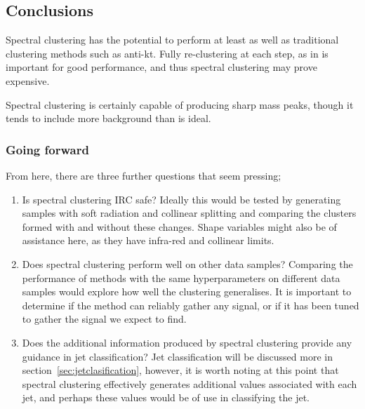 \subsection{Conclusions}
Spectral clustering has the potential to perform at least as well as 
traditional clustering methods such as anti-kt.
Fully re-clustering at each step, as in \spectralfulljet{} is important for good performance,
and thus spectral clustering may prove expensive.

Spectral clustering is certainly capable of producing sharp mass peaks,
though it tends to include more background than is ideal.

\subsubsection{Going forward}
From here, there are three further questions that seem pressing;
\begin{enumerate}
    \item Is spectral clustering IRC safe? Ideally this would be tested 
        by generating samples with soft radiation and collinear splitting
        and comparing the clusters formed with and without these changes.
        Shape variables might also be of assistance here, as they have
        infra-red and collinear limits.
    \item Does spectral clustering perform well on other data samples?
        Comparing the performance of methods with the same hyperparameters on
        different data samples would explore how well the clustering generalises.
        It is important to determine if the method can reliably gather
        any signal, or if it has been tuned to gather the signal we expect to find.
    \item Does the additional information produced by spectral clustering 
        provide any guidance in jet classification?
        Jet classification will be discussed more in section~\ref{sec:jetclasification},
        however, it is worth noting at this point that spectral clustering
        effectively generates additional values associated with each jet,
        and perhaps these values would be of use in classifying the jet.
\end{enumerate}


